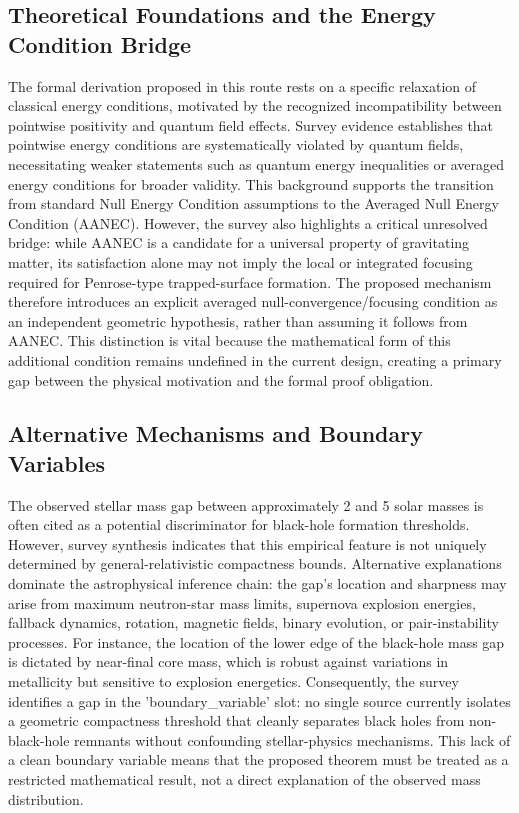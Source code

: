 \documentclass[conference]{IEEEtran}
\begin{document}
\subsection{Theoretical Foundations and the Energy Condition Bridge}
The formal derivation proposed in this route rests on a specific relaxation of classical energy conditions, motivated by the recognized incompatibility between pointwise positivity and quantum field effects. Survey evidence establishes that pointwise energy conditions are systematically violated by quantum fields, necessitating weaker statements such as quantum energy inequalities or averaged energy conditions for broader validity. This background supports the transition from standard Null Energy Condition assumptions to the Averaged Null Energy Condition (AANEC). However, the survey also highlights a critical unresolved bridge: while AANEC is a candidate for a universal property of gravitating matter, its satisfaction alone may not imply the local or integrated focusing required for Penrose-type trapped-surface formation. The proposed mechanism therefore introduces an explicit averaged null-convergence/focusing condition as an independent geometric hypothesis, rather than assuming it follows from AANEC. This distinction is vital because the mathematical form of this additional condition remains undefined in the current design, creating a primary gap between the physical motivation and the formal proof obligation.~\cite{cite_0ed84243cf171bc4}

\subsection{Alternative Mechanisms and Boundary Variables}
The observed stellar mass gap between approximately 2 and 5 solar masses is often cited as a potential discriminator for black-hole formation thresholds. However, survey synthesis indicates that this empirical feature is not uniquely determined by general-relativistic compactness bounds. Alternative explanations dominate the astrophysical inference chain: the gap's location and sharpness may arise from maximum neutron-star mass limits, supernova explosion energies, fallback dynamics, rotation, magnetic fields, binary evolution, or pair-instability processes. For instance, the location of the lower edge of the black-hole mass gap is dictated by near-final core mass, which is robust against variations in metallicity but sensitive to explosion energetics. Consequently, the survey identifies a gap in the 'boundary\_variable' slot: no single source currently isolates a geometric compactness threshold that cleanly separates black holes from non-black-hole remnants without confounding stellar-physics mechanisms. This lack of a clean boundary variable means that the proposed theorem must be treated as a restricted mathematical result, not a direct explanation of the observed mass distribution.~\cite{cite_7a407c865faafd11}
\end{document}
